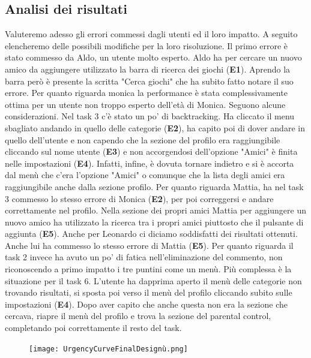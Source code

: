 \documentclass[../Report.tex]{subfiles}
\begin{document}
    \subsection{Analisi dei risultati}
    Valuteremo adesso gli errori commessi dagli utenti ed il loro impatto. A seguito elencheremo delle possibili modifiche per la loro risoluzione. 
    Il primo errore è stato commesso da Aldo, un utente molto esperto.
    Aldo ha per cercare un nuovo amico da aggiungere utilizzato la barra di ricerca dei giochi (\textbf{E1}). Aprendo la barra però è presente la scritta "Cerca giochi" che ha subito fatto notare il suo errore. 
    Per quanto riguarda monica la  performance è stata complessivamente ottima per un utente non troppo esperto dell'età di Monica. Seguono alcune considerazioni. Nel task 3 c'è stato un po' di backtracking. Ha cliccato il menu sbagliato andando in quello delle categorie (\textbf{E2}), ha capito poi di dover andare in quello dell'utente e non capendo che la sezione del profilo era raggiungibile cliccando sul nome utente (\textbf{E3}) e non accorgendosi dell'opzione "Amici" è finita nelle impostazioni (\textbf{E4}). Infatti, infine, è dovuta tornare indietro e si è accorta dal menù che c'era l'opzione "Amici" o comunque che la lista degli amici era raggiungibile anche dalla sezione profilo. 
    Per quanto riguarda Mattia, ha nel task 3 commesso lo stesso errore di Monica (\textbf{E2}), per poi correggersi e andare correttamente nel profilo. Nella sezione dei propri amici Mattia per aggiungere un nuovo amico ha utilizzato la ricerca tra i propri amici piuttosto che il pulsante di aggiunta (\textbf{E5}). Anche per Leonardo ci diciamo soddisfatti dei risultati ottenuti. Anche lui ha commesso lo stesso errore di Mattia (\textbf{E5}). Per quanto riguarda il task 2 invece ha avuto un po' di fatica nell'eliminazione del commento, non riconoscendo a primo impatto i tre puntini come un menù. Più complessa è la situazione per il task 6. L'utente ha dapprima aperto il menù delle categorie non trovando risultati, si sposta poi verso il menù del profilo cliccando subito sulle impostazioni (\textbf{E4}). Dopo aver capito che anche questa non era la sezione che cercava, riapre il menù del profilo e trova la sezione del parental control, completando poi correttamente il resto del task.\\
    \begin{figure}[H]
        \texttt{[image: UrgencyCurveFinalDesignù.png]}
        \centering
    \end{figure}
\end{document}
